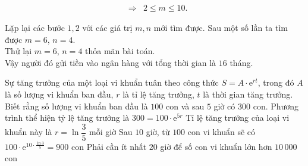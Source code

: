 \begin{ex}
{\begin{itemchoice}
\begin{enumerate}[\bf Bước 1.]
\begin{eqnarray*}
     &\Rightarrow& 2\le  m\le 10.
    \end{eqnarray*}
   \end{enumerate}
   Lặp lại các bước $1{,}2$ với các giá trị $m, n$ mới tìm được. Sau một số lần ta tìm được  $m=6$, $n=4$.\\
   Thử lại $m=6$,  $n=4$ thỏa mãn bài toán.\\
   Vậy người đó gửi tiền vào ngân  hàng với tổng thời gian là $16$ tháng.
  \end{itemchoice}
  }
\end{ex}

\begin{ex}%
 Sự tăng trưởng của một loại vi khuẩn tuân theo công thức $S=A\cdot \mathrm{e}^{rt}$, trong đó $A$ là số lượng vi khuẩn ban đầu, $r$ là tỉ lệ tăng trưởng, $t$ là thời gian tăng trưởng. Biết rằng số lượng vi khuẩn ban đầu là $100$ con và  sau $5$ giờ có $300$ con.
  \choiceTF
   {\True Phương trình thể hiện tỷ lệ tăng trưởng là $300=100\cdot \mathrm{e}^{5r}$}
  {Tỉ lệ tăng trưởng của loại  vi khuẩn này là $r=\ln \dfrac{3}{5}$ mỗi giờ}
  {\True  Sau $10$ giờ, từ $100$ con vi khuẩn sẽ có $100\cdot \mathrm{e}^{10\cdot\frac{\ln 3}{5}}=900$ con}
  {Phải cần ít nhất $20$ giờ để số con vi khuẩn lớn hơn $10\,000$  con}
\end{ex}

